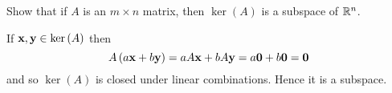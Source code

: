 \begin{enumialphparenastyle}
\begin{ex} Show that if $A$ is an $m\times n$ matrix, then $\ker \left( A\right) $
is a subspace of $\mathbb{R}^n$.
\begin{sol}
If ${\bf x},{\bf y}\in \ker \left( A\right) $ then
\[
A\left( a{\bf x}+b{\bf y}\right) =aA{\bf x}+bA{\bf y}=a{\bf 0}
+b{\bf 0}={\bf 0}
\]
and so $\ker \left( A\right) $ is closed under linear combinations. Hence it
is a subspace.
\end{sol}
\end{ex}

\end{enumialphparenastyle}